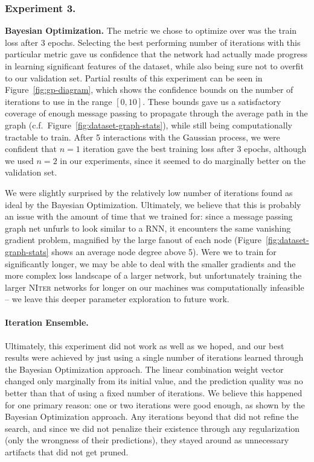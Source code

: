 \subsubsection{Experiment 3.}
\textbf{Bayesian Optimization.}
The metric we chose to optimize over was the train loss after 3 epochs.
Selecting the best performing number of iterations with this particular metric gave us confidence that the network had actually made progress in learning significant features of the dataset, while also being sure not to overfit to our validation set.
Partial results of this experiment can be seen in Figure~\ref{fig:gp-diagram}, which shows the confidence bounds on the number of iterations to use in the range $[0, 10]$.
These bounds gave us a satisfactory coverage of enough message passing to propagate through the average path in the graph (c.f.~Figure~\ref{fig:dataset-graph-stats}), while still being computationally tractable to train.
After 5 interactions with the Gaussian process, we were confident that $n=1$ iteration gave the best training loss after 3 epochs, although we used $n=2$ in our experiments, since it seemed to do marginally better on the validation set.

We were slightly surprised by the relatively low number of iterations found as ideal by the Bayesian Optimization.
Ultimately, we believe that this is probably an issue with the amount of time that we trained for: since a message passing graph net unfurls to look similar to a RNN, it encounters the same vanishing gradient problem, magnified by the large fanout of each node (Figure~\ref{fig:dataset-graph-stats} shows an average node degree above 5).
Were we to train for significantly longer, we may be able to deal with the smaller gradients and the more complex loss landscape of a larger network, but unfortunately training the larger \textsc{NIter} networks for longer on our machines was computationally infeasible -- we leave this deeper parameter exploration to future work.

\paragraph{Iteration Ensemble.}
Ultimately, this experiment did not work as well as we hoped, and our best results were achieved by just using a single number of iterations learned through the Bayesian Optimization approach.
The linear combination weight vector changed only marginally from its initial value, and the prediction quality was no better than that of using a fixed number of iterations.
We believe this happened for one primary reason: one or two iterations were good enough, as shown by the Bayesian Optimization approach.
Any iterations beyond that did not refine the search, and since we did not penalize their existence through any regularization (only the wrongness of their predictions), they stayed around as unnecessary artifacts that did not get pruned.
